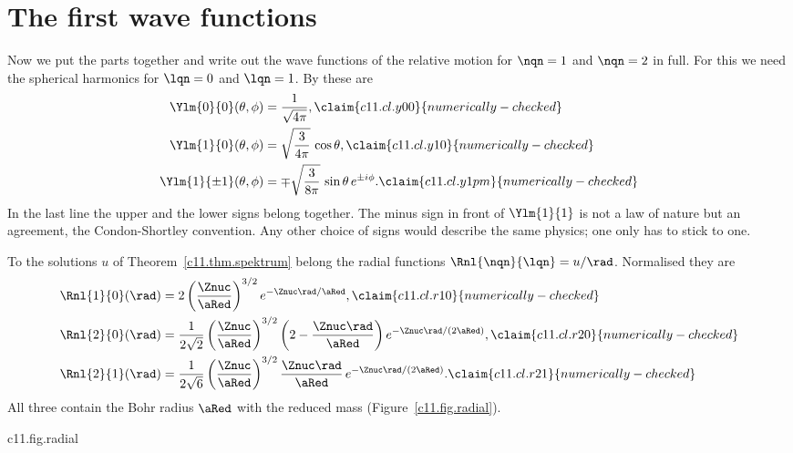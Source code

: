 \section{The first wave functions}\label{c11.s5}


Now we put the parts together and write out the wave functions of the relative motion
for $\nqn = 1$ and $\nqn = 2$ in full. For this we need the spherical harmonics for
$\lqn = 0$ and $\lqn = 1$. By  these are
\begin{align}
  \Ylm{0}{0}(\theta, \phi) &= \frac{1}{\sqrt{4\pi}},
    \label{c11.eq.y00}\claim{c11.cl.y00}{numerically-checked} \\
  \Ylm{1}{0}(\theta, \phi) &= \sqrt{\frac{3}{4\pi}}\,\cos\theta,
    \label{c11.eq.y10}\claim{c11.cl.y10}{numerically-checked} \\
  \Ylm{1}{\pm 1}(\theta, \phi) &= \mp\sqrt{\frac{3}{8\pi}}\,\sin\theta\,e^{\pm i\phi}.
    \label{c11.eq.y1pm}\claim{c11.cl.y1pm}{numerically-checked}
\end{align}
In the last line the upper and the lower signs belong together. The minus sign in front
of $\Ylm{1}{1}$ is not a law of nature but an agreement, the Condon-Shortley convention.
Any other choice of signs would describe the same physics; one only has to stick to one.

To the solutions $u$ of Theorem~\ref{c11.thm.spektrum} belong the radial functions
$\Rnl{\nqn}{\lqn} = u/\rad$. Normalised they are
\begin{align}
  \Rnl{1}{0}(\rad) &= 2\left(\frac{\Znuc}{\aRed}\right)^{3/2} e^{-\Znuc\rad/\aRed},
    \label{c11.eq.r10}\claim{c11.cl.r10}{numerically-checked} \\
  \Rnl{2}{0}(\rad) &= \frac{1}{2\sqrt{2}}\left(\frac{\Znuc}{\aRed}\right)^{3/2}
    \left(2 - \frac{\Znuc\rad}{\aRed}\right) e^{-\Znuc\rad/(2\aRed)},
    \label{c11.eq.r20}\claim{c11.cl.r20}{numerically-checked} \\
  \Rnl{2}{1}(\rad) &= \frac{1}{2\sqrt{6}}\left(\frac{\Znuc}{\aRed}\right)^{3/2}
    \frac{\Znuc\rad}{\aRed}\,e^{-\Znuc\rad/(2\aRed)}.
    \label{c11.eq.r21}\claim{c11.cl.r21}{numerically-checked}
\end{align}
All three contain the Bohr radius $\aRed$ with the reduced mass
(Figure~\ref{c11.fig.radial}).

\begin{tpcfigure}{c11.fig.radial}
  \caption{The radial functions \eqref{c11.eq.r10} to \eqref{c11.eq.r21} for
    $\Znuc = 1$. $\Rnl{1}{0}$ and $\Rnl{2}{0}$ are different from zero at the origin,
    $\Rnl{2}{1}$ starts at zero. $\Rnl{2}{0}$ changes sign at $\rad = 2\aRed$; such a
    zero is called a node.}
\end{tpcfigure}

